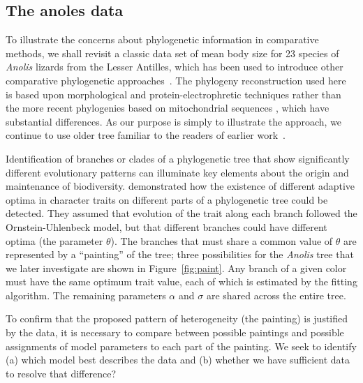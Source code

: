 \subsection{The anoles data}
To illustrate the concerns about phylogenetic information in comparative methods, we shall revisit a classic data set of mean body size for 23 species of {\it Anolis} lizards from the Lesser Antilles, which has been used to introduce other comparative phylogenetic approaches~\citep[e.g.][familiar to many who have used the \texttt{ouch} package]{Butler2004}.  
The phylogeny reconstruction used here~\citep{Losos1990} is based upon  morphological \citep{Lazell1972} and protein-electrophretic \citep{Gorman1976} techniques rather than the more recent phylogenies based on mitochondrial sequences \citep{Schneider2001, Stenson2004}, which have substantial differences.  As our purpose is simply to illustrate the approach, we continue to use older tree familiar to the readers of earlier work~\citep{Losos1990, Butler2004}.

Identification of branches or clades of a phylogenetic tree that show significantly different evolutionary patterns can illuminate key elements about the origin and maintenance of biodiversity. 
\citet{Butler2004} demonstrated how the existence of different adaptive optima in character traits on different parts of a phylogenetic tree could be detected.  
They assumed that evolution of the trait along each branch followed the Ornstein-Uhlenbeck model, 
but that different branches could have different optima (the parameter $\theta$). 
The branches that must share a common value of $\theta$ are represented by a ``painting'' of the tree;
three possibilities for the {\it Anolis} tree that we later investigate are shown in Figure~\ref{fig:paint}.  
Any branch of a given color must have the same optimum trait value, each of which is estimated by the fitting algorithm.  
The remaining parameters $\alpha$ and $\sigma$ are shared across the entire tree.

To confirm that the proposed pattern of heterogeneity (the painting) is justified by the data, 
it is necessary to compare between possible paintings and possible assignments of model parameters 
to each part of the painting.
We seek to identify (a) which model best describes the data and 
(b) whether we have sufficient data to resolve that difference?  



